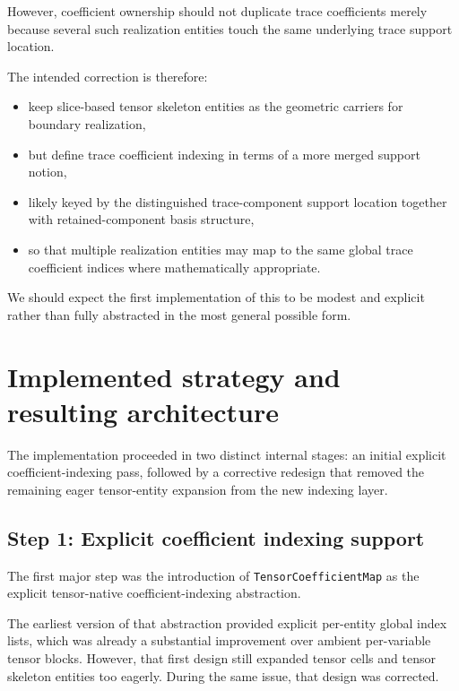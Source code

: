 \documentclass[11pt]{article}
\begin{document}
However, coefficient ownership should not duplicate trace coefficients merely because several such realization entities touch the same underlying trace support location.

The intended correction is therefore:
\begin{itemize}[leftmargin=2em]
\item keep slice-based tensor skeleton entities as the geometric carriers for boundary realization,
\item but define trace coefficient indexing in terms of a more merged support notion,
\item likely keyed by the distinguished trace-component support location together with retained-component basis structure,
\item so that multiple realization entities may map to the same global trace coefficient indices where mathematically appropriate.
\end{itemize}

We should expect the first implementation of this to be modest and explicit rather than fully abstracted in the most general possible form.

\section{Implemented strategy and resulting architecture}

The implementation proceeded in two distinct internal stages: an initial explicit coefficient-indexing pass, followed by a corrective redesign that removed the remaining eager tensor-entity expansion from the new indexing layer.

\subsection{Step 1: Explicit coefficient indexing support}

The first major step was the introduction of \texttt{TensorCoefficientMap} as the explicit tensor-native coefficient-indexing abstraction.

The earliest version of that abstraction provided explicit per-entity global index lists, which was already a substantial improvement over ambient per-variable tensor blocks.  However, that first design still expanded tensor cells and tensor skeleton entities too eagerly.  During the same issue, that design was corrected.
\end{document}
